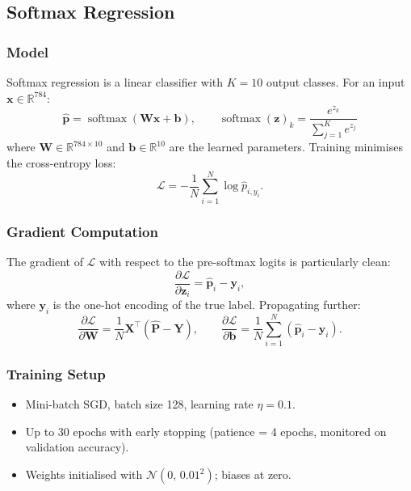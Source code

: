 \documentclass[12pt,a4paper]{article}
\begin{document}
\subsection{Softmax Regression}

\subsubsection{Model}

Softmax regression is a linear classifier with $K=10$ output classes.  For an
input $\mathbf{x}\in\mathbb{R}^{784}$:
\[
  \hat{\mathbf{p}} = \operatorname{softmax}(\mathbf{W}\mathbf{x}+\mathbf{b}),
  \qquad
  \operatorname{softmax}(\mathbf{z})_k = \frac{e^{z_k}}{\sum_{j=1}^{K}e^{z_j}}
\]
where $\mathbf{W}\in\mathbb{R}^{784\times10}$ and $\mathbf{b}\in\mathbb{R}^{10}$
are the learned parameters.  Training minimises the cross-entropy loss:
\[
  \mathcal{L} = -\frac{1}{N}\sum_{i=1}^{N}\log\hat{p}_{i,y_i}.
\]

\subsubsection{Gradient Computation}

The gradient of $\mathcal{L}$ with respect to the pre-softmax logits is
particularly clean:
\[
  \frac{\partial\mathcal{L}}{\partial\mathbf{z}_i} = \hat{\mathbf{p}}_i - \mathbf{y}_i,
\]
where $\mathbf{y}_i$ is the one-hot encoding of the true label.  Propagating
further:
\[
  \frac{\partial\mathcal{L}}{\partial\mathbf{W}}
    = \frac{1}{N}\mathbf{X}^{\!\top}(\hat{\mathbf{P}}-\mathbf{Y}),
  \qquad
  \frac{\partial\mathcal{L}}{\partial\mathbf{b}}
    = \frac{1}{N}\sum_{i=1}^{N}(\hat{\mathbf{p}}_i-\mathbf{y}_i).
\]

\subsubsection{Training Setup}

\begin{itemize}
  \item Mini-batch SGD, batch size 128, learning rate $\eta=0.1$.
  \item Up to 30 epochs with early stopping (patience = 4 epochs, monitored on
        validation accuracy).
  \item Weights initialised with $\mathcal{N}(0,\,0.01^2)$; biases at zero.
\end{itemize}
\end{document}

